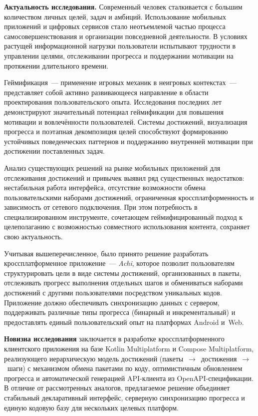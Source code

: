 \documentclass[../main.tex]{subfiles}
\begin{document}
	\textbf{Актуальность исследования.} Современный человек сталкивается с большим количеством личных целей, задач и амбиций. Использование мобильных приложений и цифровых сервисов стало неотъемлемой частью процесса самосовершенствования и организации повседневной деятельности. В условиях растущей информационной нагрузки пользователи испытывают трудности в управлении целями, отслеживании прогресса и поддержании мотивации на протяжении длительного времени.

	Геймификация~--- применение игровых механик в неигровых контекстах~--- представляет собой активно развивающееся направление в области проектирования пользовательского опыта. Исследования последних лет демонстрируют значительный потенциал геймификации для повышения мотивации и вовлечённости пользователей. Системы достижений, визуализация прогресса и поэтапная декомпозиция целей способствуют формированию устойчивых поведенческих паттернов и поддержанию внутренней мотивации при достижении поставленных задач.

	Анализ существующих решений на рынке мобильных приложений для отслеживания достижений и привычек выявил ряд существенных недостатков: нестабильная работа интерфейса, отсутствие возможности обмена пользовательскими наборами достижений, ограниченная кроссплатформенность и зависимость от сетевого подключения. При этом потребность в специализированном инструменте, сочетающем геймифицированный подход к целеполаганию с возможностью совместного использования контента, сохраняет свою актуальность.

	Учитывая вышеперечисленное, было принято решение разработать кроссплатформенное приложение~--- \textit{Achi}, которое позволит пользователям структурировать цели в виде системы достижений, организованных в пакеты, отслеживать прогресс выполнения отдельных шагов и обмениваться наборами достижений с другими пользователями посредством уникальных кодов. Приложение должно обеспечивать синхронизацию данных с сервером, поддерживать различные типы прогресса (бинарный и инкрементальный) и предоставлять единый пользовательский опыт на платформах Android и~Web.

	\textbf{Новизна исследования} заключается в разработке кроссплатформенного клиентского приложения на базе Kotlin Multiplatform и Compose Multiplatform, реализующего иерархическую модель достижений (пакеты~$\rightarrow$~достижения~$\rightarrow$~шаги) с механизмом обмена пакетами по коду, оптимистичным обновлением прогресса и автоматической генерацией API-клиента из OpenAPI-спецификации. В отличие от рассмотренных аналогов, предлагаемое решение объединяет стабильный декларативный интерфейс, серверную синхронизацию прогресса и единую кодовую базу для нескольких целевых платформ.
\end{document}
